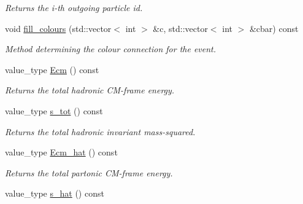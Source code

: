\begin{DoxyCompactItemize}
\begin{DoxyCompactList}\small\item\em Returns the i-\/th outgoing particle id. \end{DoxyCompactList}\item 
\hypertarget{a00210_ab6c23b5b397048e7900ea14cc07f45fc}{void \hyperlink{a00210_ab6c23b5b397048e7900ea14cc07f45fc}{fill\-\_\-colours} (std\-::vector$<$ int $>$ \&c, std\-::vector$<$ int $>$ \&cbar) const }\label{a00210_ab6c23b5b397048e7900ea14cc07f45fc}

\begin{DoxyCompactList}\small\item\em Method determining the colour connection for the event. \end{DoxyCompactList}\item 
\hypertarget{a00210_ad7d0811b50df49cd86bedbcc79f05e6f}{value\-\_\-type \hyperlink{a00210_ad7d0811b50df49cd86bedbcc79f05e6f}{Ecm} () const }\label{a00210_ad7d0811b50df49cd86bedbcc79f05e6f}

\begin{DoxyCompactList}\small\item\em Returns the total hadronic C\-M-\/frame energy. \end{DoxyCompactList}\item 
\hypertarget{a00210_a2a483bce8138485806cf5ef7d8d9ab44}{value\-\_\-type \hyperlink{a00210_a2a483bce8138485806cf5ef7d8d9ab44}{s\-\_\-tot} () const }\label{a00210_a2a483bce8138485806cf5ef7d8d9ab44}

\begin{DoxyCompactList}\small\item\em Returns the total hadronic invariant mass-\/squared. \end{DoxyCompactList}\item 
\hypertarget{a00210_acd66edc648589315d436008b7544148f}{value\-\_\-type \hyperlink{a00210_acd66edc648589315d436008b7544148f}{Ecm\-\_\-hat} () const }\label{a00210_acd66edc648589315d436008b7544148f}

\begin{DoxyCompactList}\small\item\em Returns the total partonic C\-M-\/frame energy. \end{DoxyCompactList}\item 
\hypertarget{a00210_a780da5b3f638f3ab714ef2ee77224dbf}{value\-\_\-type \hyperlink{a00210_a780da5b3f638f3ab714ef2ee77224dbf}{s\-\_\-hat} () const }\label{a00210_a780da5b3f638f3ab714ef2ee77224dbf}


\end{DoxyCompactItemize}
